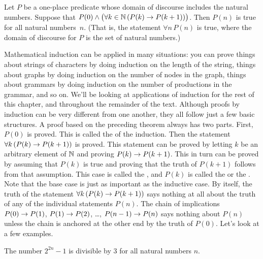 \begin{theorem}
Let $P$ be a one-place predicate whose domain of discourse includes
the natural numbers.  Suppose that $P(0)\wedge \big(\forall k\in{\mathbb N}\,(P(k)\rightarrow P(k+1))\big)$.
Then $P(n)$ is true for all natural numbers~$n$.  (That is, 
the statement $\forall n\,P(n)$ is true, where the domain of discourse for $P$ is
the set of natural numbers.)
\end{theorem}

Mathematical induction can be applied in many situations:
you can prove things about strings of characters by doing induction on the
length of the string, things about graphs by doing induction on the
number of nodes in the graph, things about grammars by doing induction on
the number of productions in the grammar, and so on. We'll
be looking at applications of induction for the rest of this chapter,
and throughout the remainder of the text.
Although proofs by induction can be very different from one
another, they all follow just a few basic structures.  A proof based
on the preceding theorem always has two parts.  First, $P(0)$
is proved.  This is called the  of the induction.
Then the statement $\forall k\,(P(k)\rightarrow P(k+1))$ is proved.
This statement can be proved by letting $k$ be an arbitrary
element of ${\mathbb N}$ and proving $P(k)\rightarrow P(k+1)$.  This in turn can
be proved by assuming that $P(k)$ is true and proving that
the truth of $P(k+1)$ follows from that assumption.  This case is called
the , and $P(k)$ is called the  or
the .
Note that the base case is just as important
as the inductive case.  By itself, the truth of the statement $\forall k\,(P(k)\rightarrow P(k+1))$
says nothing at all about the truth of any of the individual statements $P(n)$.
The chain of implications $P(0)\rightarrow P(1)$, $P(1)\rightarrow P(2)$, \dots, 
$P(n-1)\rightarrow P(n)$ says nothing about $P(n)$ unless the chain is
anchored at the other end by the truth of $P(0)$.  Let's look
at a few examples.

\begin{theorem}
The number $2^{2n}-1$ is divisible by 3 for all natural numbers $n$.
\end{theorem}

